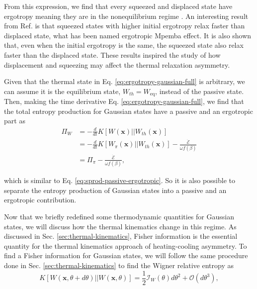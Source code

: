 \noindent From this expression, we find that every squeezed and displaced state have ergotropy meaning they are in the nonequilibrium regime \cite{huber-2016}. An interesting result from Ref. \cite{medina-2025} is that squeezed states with higher initial ergotropy relax faster than displaced state, what has been named ergotropic Mpemba effect. It is also shown that, even when the initial ergotropy is the same, the squeezed state also relax faster than the displaced state. These results inspired the study of how displacement and squeezing may affect the thermal relaxation asymmetry.

Given that the thermal state in Eq. \eqref{eq:ergotropy-gaussian-full} is arbitrary, we can assume it is the equilibrium state, $W_{th} = W_{\text{eq}}$, instead of the passive state. Then, making the time derivative Eq. \eqref{eq:ergotropy-gaussian-full}, we find that the total entropy production for Gaussian states have a passive and an ergotropic part as
\begin{equation}
    \begin{split}
        \Pi_W &= - \frac{d}{dt} K[W(\mathbf{x}) || W_{th}(\mathbf{x})] \\
        &= -\frac{d}{dt} K[W_\pi(\mathbf{x}) || W_{th}(\mathbf{x})] - \frac{\dot{\mathcal{E}}}{\omega f(\beta)}\\
        &= \Pi_\pi - \frac{\dot{\mathcal{E}}}{\omega f(\beta)},
    \end{split}
    \label{eq:sprod-passive-ergotropic-gaussian}
\end{equation}

\noindent which is similar to Eq. \eqref{eq:sprod-passive-ergotropic}. So it is also possible to separate the entropy production of Gaussian states into a passive and an ergotropic contribution.

Now that we briefly redefined some thermodynamic quantities for Gaussian states, we will discuss how the thermal kinematics change in this regime. As discussed in Sec. \ref{sec:thermal-kinematics}, Fisher information is the essential quantity for the thermal kinematics approach of heating-cooling asymmetry. To find a Fisher information for Gaussian states, we will follow the same procedure done in Sec. \ref{sec:thermal-kinematics} to find the Wigner relative entropy as
\begin{equation}
    K[W(\mathbf{x}, \theta+d\theta) || W(\mathbf{x}, \theta)] = \frac{1}{2} \mathcal{I}_W(\theta) d\theta^2 + \mathcal{O}(d\theta^3),
\end{equation}

